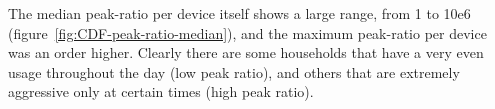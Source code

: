 The median peak-ratio per device itself shows a large range, from 1 to 10e6 (figure~\ref{fig:CDF-peak-ratio-median}), and the maximum peak-ratio per device was an order higher. Clearly there are some households that have a very even usage throughout the day (low peak ratio), and others that are extremely aggressive only at certain times (high peak ratio).


